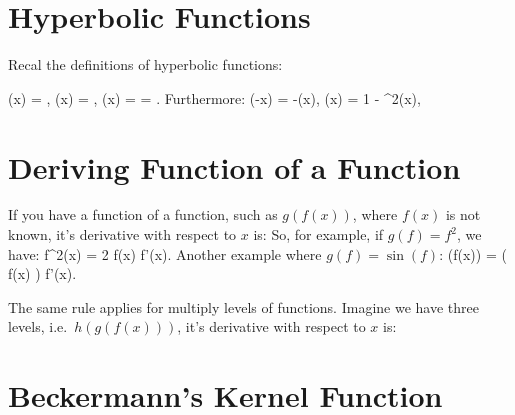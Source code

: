 \documentclass[fleqn]{article}    %
\begin{document}

\section{Hyperbolic Functions}

\noindent
Recal the definitions of hyperbolic functions:

\be 
  \sinh(x) = , 
\ee
\be 
  \cosh(x) = , 
\ee
\be 
  \tanh(x) =  = .
\ee
%
Furthermore:
%
\be 
  \tanh(-x)                  = -\tanh(x),        
\ee
\be 
   \tanh(x)      = 1 - \tanh^2(x),   
\ee
{} 

\section{Deriving Function of a Function}

\noindent
If you have a function of a function, such as $g(f(x))$, where $f(x)$ is not 
known, it's derivative with respect to $x$ is:
%
%
So, for example, if $g(f) = f^2$, we have:
%
\be
   f^2(x) = 2 f(x) f'(x).            
\ee
%
Another example where $g(f) = \sin(f)$:
%
\be
   \sin(f(x)) = \cos( f(x) ) f'(x).            
\ee
%

\noindent
The same rule applies for multiply levels of functions. Imagine we have three
levels, i.e.\ $h(g(f(x)))$, it's derivative with respect to $x$ is:
%
%

\section{Beckermann's Kernel Function}
\end{document}
